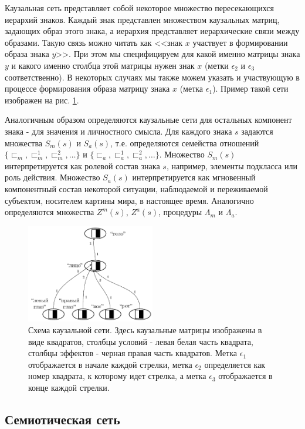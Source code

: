 \documentclass[12pt]{report}
\begin{document}
	Каузальная сеть представляет собой некоторое множество пересекающихся иерархий знаков. Каждый знак представлен множеством каузальных матриц, задающих образ этого знака, а иерархия представляет иерархические связи между образами. Такую связь можно читать как <<знак $x$ участвует в формировании образа знака $y$>>. При этом мы специфицируем для какой именно матрицы знака $y$ и какого именно столбца этой матрицы нужен знак $x$ (метки $\epsilon_2$ и $\epsilon_3$ соответственно). В некоторых случаях мы также можем указать и участвующую в процессе формирования образа матрицу знака $x$ (метка $\epsilon_1$). Пример такой сети изображен на рис. \ref{fig:caus_net}.
	
	Аналогичным образом определяются каузальные сети для остальных компонент знака - для значения и личностного смысла. Для каждого знака $s$ задаются множества $S_m(s)$ и $S_a(s)$, т.е. определяются семейства отношений $\{\sqsubset_m,\sqsubset_m^1,\sqsubset_m^2,\dots\}$ и $\{\sqsubset_a,\sqsubset_a^1,\sqsubset_a^2,\dots\}$. Множество $S_m(s)$ интерпретируется как ролевой состав знака $s$, например, элементы подкласса или роль действия. Множество $S_a(s)$ интерпретируется как мгновенный компонентный состав некоторой ситуации, наблюдаемой и переживаемой субъектом, носителем картины мира, в настоящее время. Аналогично определяются множества $Z^m(s)$, $Z^a(s)$, процедуры $\Lambda_m$ и $\Lambda_a$.
	
	\begin{figure}
		\centering
		\includegraphics[width=0.5\textwidth]{examples/causnet/caus_net}
		\caption{Схема каузальной сети. Здесь каузальные матрицы изображены в виде квадратов, столбцы условий - левая белая часть квадрата, столбцы эффектов - черная правая часть квадратов. Метка $\epsilon_1$ отображается в начале каждой стрелки, метка $\epsilon_2$ определяется как номер квадрата, к которому идет стрелка, а метка $\epsilon_3$ отображается в конце каждой стрелки.}
		\label{fig:caus_net}		
	\end{figure}
	
	\subsection{Семиотическая сеть} \label{sec:semiotics}
	
\end{document}
